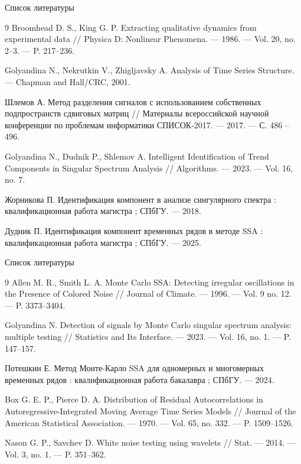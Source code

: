 \documentclass[pdf,notheorems,10pt,intlimits,unicode]{beamer}
\begin{document}
\begin{frame}{Список литературы}

    \begin{thebibliography}{9}
        Broomhead D. S., King G. P. Extracting qualitative dynamics from experimental data // Physica D: Nonlinear Phenomena. — 1986. — Vol. 20, no. 2–3. — P. 217–236.

        Golyandina N., Nekrutkin V., Zhigljavsky A. Analysis of Time Series Structure. — Chapman and Hall/CRC, 2001.

        Шлемов А. Метод разделения сигналов с использованием собственных подпространств сдвиговых матриц // Материалы всероссийской научной конференции по проблемам информатики СПИСОК-2017. — 2017. — С. 486 – 496.

        Golyandina N., Dudnik P., Shlemov A. Intelligent Identification of Trend Components in Singular Spectrum Analysis // Algorithms. — 2023. — Vol. 16, no. 7.

        Жорникова П. Идентификация компонент в анализе сингулярного спектра : квалификационная работа магистра ; СПбГУ. — 2018.

        Дудник П. Идентификация компонент временных рядов в методе SSA : квалификационная работа магистра ; СПбГУ. — 2025.

    \end{thebibliography}

\end{frame}

\begin{frame}{Список литературы}
    
    \begin{thebibliography}{9}
        Allen M. R., Smith L. A. Monte Carlo SSA: Detecting irregular oscillations in the Presence of Colored Noise // Journal of Climate. — 1996. — Vol. 9 no. 12. — P. 3373–3404.

        Golyandina N. Detection of signals by Monte Carlo singular spectrum analysis: multiple testing // Statistics and Its Interface. — 2023. — Vol. 16, no. 1. — P. 147–157.

        Потешкин Е. Метод Монте-Карло SSA для одномерных и многомерных временных рядов : квалификационная работа бакалавра ; СПбГУ. — 2024.

        Box G. E. P., Pierce D. A. Distribution of Residual Autocorrelations in Autoregressive-Integrated Moving Average Time Series Models // Journal of the American Statistical Association. — 1970. — Vol. 65, no. 332. — P. 1509–1526.

        Nason G. P., Savchev D. White noise testing using wavelets // Stat. — 2014. — Vol. 3, no. 1. — P. 351–362.
    \end{thebibliography} 

\end{frame}
\end{document}
